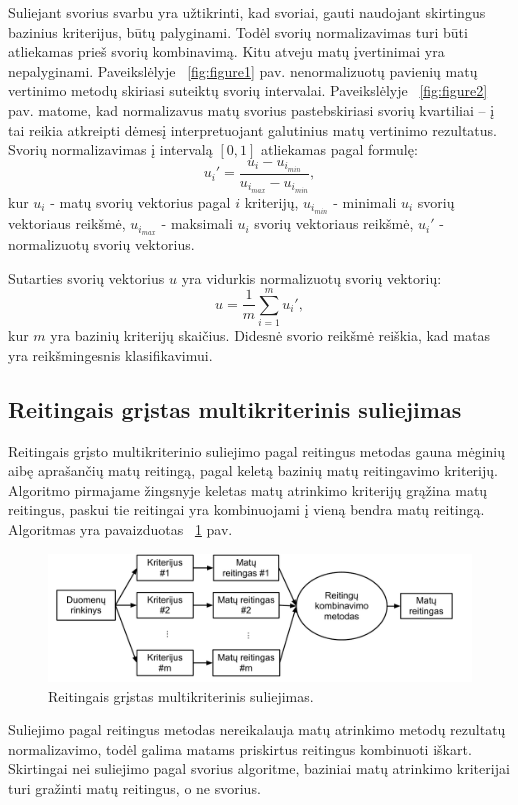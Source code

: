 Suliejant svorius svarbu yra užtikrinti, kad svoriai, gauti naudojant skirtingus bazinius kriterijus, būtų palyginami. Todėl svorių normalizavimas turi būti atliekamas prieš svorių kombinavimą. Kitu atveju matų įvertinimai yra nepalyginami. Paveikslėlyje ~\ref{fig:figure1} pav. nenormalizuotų pavienių matų vertinimo metodų skiriasi suteiktų svorių intervalai. Paveikslėlyje ~\ref{fig:figure2} pav. matome, kad normalizavus matų svorius pastebskiriasi svorių kvartiliai -- į tai reikia atkreipti dėmesį interpretuojant galutinius matų vertinimo rezultatus. Svorių normalizavimas į intervalą $[0, 1]$ atliekamas pagal formulę:
\begin{equation}
 u_i'=\frac{u_i - u_{i_{min}}}{u_{i_{max}} - u_{i_{min}}}, 
\end{equation}
kur $u_i$ - matų svorių vektorius pagal $i$ kriterijų, 
$u_{i_{min}}$ - minimali $u_i$ svorių vektoriaus reikšmė,
$u_{i_{max}}$ - maksimali $u_i$ svorių vektoriaus reikšmė,
$u_i'$ - normalizuotų svorių vektorius.

Sutarties svorių vektorius $u$ yra vidurkis normalizuotų svorių vektorių:
\begin{equation}
 u = \frac{1}{m}\sum_{i=1}^m u_i',
\end{equation}
kur $m$ yra bazinių kriterijų skaičius. Didesnė svorio reikšmė reiškia, kad matas yra reikšmingesnis klasifikavimui.

\subsection{Reitingais grįstas multikriterinis suliejimas}

Reitingais grįsto multikriterinio suliejimo pagal reitingus metodas gauna mėginių aibę aprašančių matų reitingą, pagal keletą bazinių matų reitingavimo kriterijų. Algoritmo pirmajame žingsnyje keletas matų atrinkimo kriterijų grąžina matų reitingus, paskui tie reitingai yra kombinuojami į vieną bendra matų reitingą. Algoritmas yra
pavaizduotas ~\ref{fig:figure5} pav.
\begin{figure}
 \centering
 \includegraphics[width=1\textwidth]{images/ranking_based_fusion.pdf}
 \caption{Reitingais grįstas multikriterinis suliejimas.}
 \label{fig:figure5}
\end{figure}
Suliejimo pagal reitingus metodas nereikalauja matų atrinkimo metodų rezultatų normalizavimo, todėl galima matams priskirtus reitingus kombinuoti iškart. Skirtingai nei suliejimo pagal svorius algoritme, baziniai matų atrinkimo kriterijai turi gražinti matų reitingus, o ne svorius.

